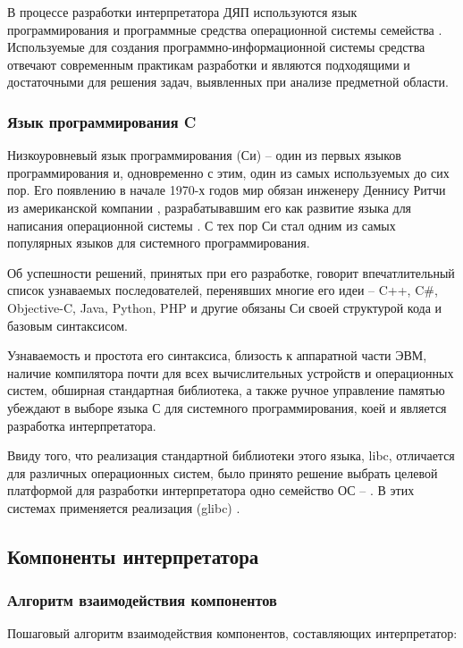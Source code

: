 В процессе разработки интерпретатора ДЯП используются язык программирования  и программные средства операционной системы семейства . Используемые для создания программно-информационной системы средства отвечают современным практикам разработки и являются подходящими и достаточными для решения задач, выявленных при анализе предметной области.

\subsubsection{Язык программирования C}

Низкоуровневый язык программирования  (Си) -- один из первых языков программирования и, одновременно с этим, один из самых используемых до сих пор. Его появлению в начале 1970-х годов мир обязан инженеру Деннису Ритчи из американской компании , разрабатывавшим его как развитие языка  для написания операционной системы  \cite{e7}. С тех пор Си стал одним из самых популярных языков для системного программирования.

Об успешности решений, принятых при его разработке, говорит впечатлительный список узнаваемых последователей, перенявших многие его идеи -- C++, C\#, Objective-C, Java, Python, PHP и другие обязаны Си своей структурой кода и базовым синтаксисом.

Узнаваемость и простота его синтаксиса, близость к аппаратной части ЭВМ, наличие компилятора почти для всех вычислительных устройств и операционных систем, обширная стандартная библиотека, а также ручное управление памятью убеждают в выборе языка С для системного программирования, коей и является разработка интерпретатора.

Ввиду того, что реализация стандартной библиотеки этого языка, libc, отличается для различных операционных систем, было принято решение выбрать целевой платформой для разработки интерпретатора одно семейство ОС -- . В этих системах применяется реализация  (glibc) \cite{e13}.


\subsection{Компоненты интерпретатора}

\subsubsection{Алгоритм взаимодействия компонентов}
Пошаговый алгоритм взаимодействия компонентов, составляющих интерпретатор:

